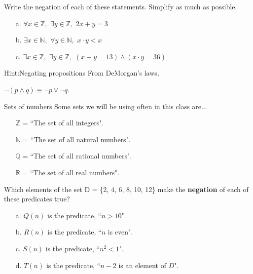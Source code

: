 {    \newpage

    \begin{questionNOGRADE}{\thequestion}
        Write the negation of each of these statements. Simplify as much as possible.
        
        \begin{enumerate}
            \item[a.] $\forall x \in \mathbb{Z},$ \tab[0.2cm] $\exists y \in \mathbb{Z},$ \tab[0.2cm] $2x+y = 3$
            \item[b.] $\exists x \in \mathbb{N},$ \tab[0.2cm] $\forall y \in \mathbb{N},$ \tab[0.2cm] $x \cdot y < x$
            \item[c.] $\exists x \in \mathbb{Z},$ \tab[0.2cm] $\exists y \in \mathbb{Z},$ \tab[0.2cm] $(x + y = 13) \land (x \cdot y = 36)$
        \end{enumerate}
    \end{questionNOGRADE}
        
    \begin{hint}{Hint:Negating propositions}
        From DeMorgan's laws,
        \begin{center}
            $\neg(p \land q) \equiv \neg p \lor \neg q$.
        \end{center} 
    \end{hint}
    
    \begin{hint}{Sets of numbers}
        Some sets we will be using often in this class are...
        \begin{itemize}
            \item[] $\mathbb{Z}$ = ``The set of all integers".
            \item[] $\mathbb{N}$ = ``The set of all natural numbers".
            \item[] $\mathbb{Q}$ = ``The set of all rational numbers".
            \item[] $\mathbb{R}$ = ``The set of all real numbers".
        \end{itemize}
    \end{hint}

    \hrulefill

    \begin{questionNOGRADE}{\thequestion}
        Which elements of the set D = \{2, 4, 6, 8, 10, 12\} make the
        \textbf{negation} of each of these predicates true?
        
        \begin{enumerate}
            \item[a.] $Q(n)$ is the predicate, ``$n > 10$".
            \item[b.] $R(n)$ is the predicate, ``$n$ is even".
            \item[c.] $S(n)$ is the predicate, ``$n^{2} < 1$".
            \item[d.] $T(n)$ is the predicate, ``$n-2$ is an element of $D$".
        \end{enumerate}
    \end{questionNOGRADE}


}
